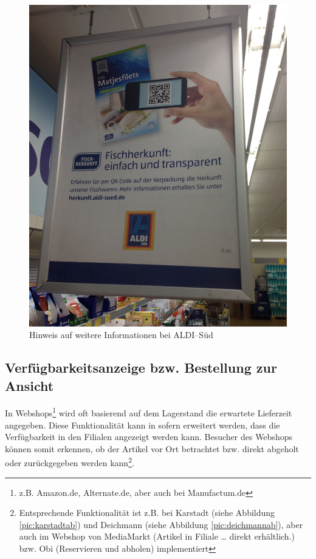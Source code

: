 \hfill
\begin{minipage}[t]{0.4\textwidth}
\begin{figure}[H]
\begin{center}
\includegraphics[width=\textwidth]{ALDI-QR.jpg}
\caption{Hinweis auf weitere Informationen bei ALDI--Süd}
\label{pic:aldiqr}
\end{center}
\end{figure}
\end{minipage}

\subsection{Verfügbarkeitsanzeige bzw. Bestellung zur Ansicht}
\label{bza}

In Webshops\footnote{z.B. Amazon.de, Alternate.de, aber auch bei Manufactum.de} wird oft basierend auf dem Lagerstand die erwartete Lieferzeit angegeben. Diese Funktionalität kann in sofern erweitert werden, dass die Verfügbarkeit in den Filialen angezeigt werden kann. Besucher des Webshops können somit erkennen, ob der Artikel vor Ort betrachtet bzw. direkt abgeholt oder zurückgegeben werden kann\footnote{Entsprechende Funktionalität ist z.B. bei Karstadt (siehe Abbildung \ref{pic:karstadtab}) und Deichmann (siehe Abbildung \ref{pic:deichmannab}), aber auch im Webshop von MediaMarkt (Artikel in Filiale … direkt erhältlich.) bzw. Obi (Reservieren und abholen) implementiert}. 

